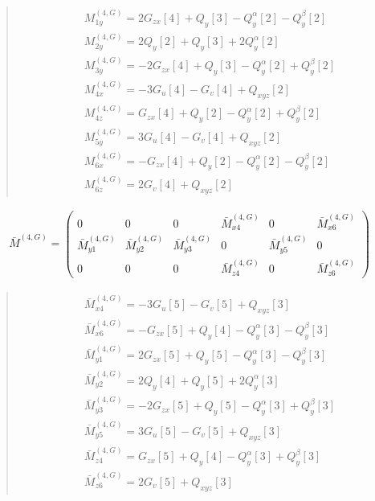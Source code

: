 \documentclass[fleqn,10pt]{jsarticle}
\begin{document}
\begin{quote}
\begin{align*}
& M^{(4,G)}_{1y} = 2 G_{zx}[4] + Q_{y}[3] - Q_{y}^{\alpha}[2] - Q_{y}^{\beta}[2] \\
& M^{(4,G)}_{2y} = 2 Q_{y}[2] + Q_{y}[3] + 2 Q_{y}^{\alpha}[2] \\
& M^{(4,G)}_{3y} = - 2 G_{zx}[4] + Q_{y}[3] - Q_{y}^{\alpha}[2] + Q_{y}^{\beta}[2] \\
& M^{(4,G)}_{4x} = - 3 G_{u}[4] - G_{v}[4] + Q_{xyz}[2] \\
& M^{(4,G)}_{4z} = G_{zx}[4] + Q_{y}[2] - Q_{y}^{\alpha}[2] + Q_{y}^{\beta}[2] \\
& M^{(4,G)}_{5y} = 3 G_{u}[4] - G_{v}[4] + Q_{xyz}[2] \\
& M^{(4,G)}_{6x} = - G_{zx}[4] + Q_{y}[2] - Q_{y}^{\alpha}[2] - Q_{y}^{\beta}[2] \\
& M^{(4,G)}_{6z} = 2 G_{v}[4] + Q_{xyz}[2]
\end{align*}
\end{quote}
\begin{align*}
\bar{M}^{(4,G)} = \begin{pmatrix} 0 & 0 & 0 & \bar{M}^{(4,G)}_{x4} & 0 & \bar{M}^{(4,G)}_{x6} \\ \bar{M}^{(4,G)}_{y1} & \bar{M}^{(4,G)}_{y2} & \bar{M}^{(4,G)}_{y3} & 0 & \bar{M}^{(4,G)}_{y5} & 0 \\ 0 & 0 & 0 & \bar{M}^{(4,G)}_{z4} & 0 & \bar{M}^{(4,G)}_{z6} \end{pmatrix}
\end{align*}
\begin{quote}
\begin{align*}
& \bar{M}^{(4,G)}_{x4} = - 3 G_{u}[5] - G_{v}[5] + Q_{xyz}[3] \\
& \bar{M}^{(4,G)}_{x6} = - G_{zx}[5] + Q_{y}[4] - Q_{y}^{\alpha}[3] - Q_{y}^{\beta}[3] \\
& \bar{M}^{(4,G)}_{y1} = 2 G_{zx}[5] + Q_{y}[5] - Q_{y}^{\alpha}[3] - Q_{y}^{\beta}[3] \\
& \bar{M}^{(4,G)}_{y2} = 2 Q_{y}[4] + Q_{y}[5] + 2 Q_{y}^{\alpha}[3] \\
& \bar{M}^{(4,G)}_{y3} = - 2 G_{zx}[5] + Q_{y}[5] - Q_{y}^{\alpha}[3] + Q_{y}^{\beta}[3] \\
& \bar{M}^{(4,G)}_{y5} = 3 G_{u}[5] - G_{v}[5] + Q_{xyz}[3] \\
& \bar{M}^{(4,G)}_{z4} = G_{zx}[5] + Q_{y}[4] - Q_{y}^{\alpha}[3] + Q_{y}^{\beta}[3] \\
& \bar{M}^{(4,G)}_{z6} = 2 G_{v}[5] + Q_{xyz}[3]
\end{align*}
\end{quote}
\end{document}
